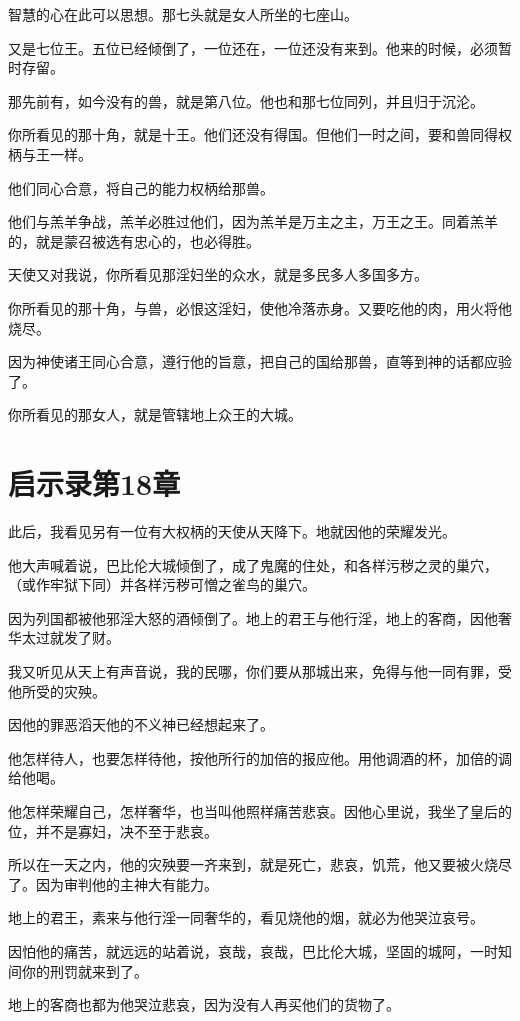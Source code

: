 \documentclass[12pt,oneside]{book}
\begin{document}
智慧的心在此可以思想。那七头就是女人所坐的七座山。

又是七位王。五位已经倾倒了，一位还在，一位还没有来到。他来的时候，必须暂时存留。

那先前有，如今没有的兽，就是第八位。他也和那七位同列，并且归于沉沦。

你所看见的那十角，就是十王。他们还没有得国。但他们一时之间，要和兽同得权柄与王一样。

他们同心合意，将自己的能力权柄给那兽。

他们与羔羊争战，羔羊必胜过他们，因为羔羊是万主之主，万王之王。同着羔羊的，就是蒙召被选有忠心的，也必得胜。

天使又对我说，你所看见那淫妇坐的众水，就是多民多人多国多方。

你所看见的那十角，与兽，必恨这淫妇，使他冷落赤身。又要吃他的肉，用火将他烧尽。

因为神使诸王同心合意，遵行他的旨意，把自己的国给那兽，直等到神的话都应验了。

你所看见的那女人，就是管辖地上众王的大城。

\chapter{启示录第18章}
此后，我看见另有一位有大权柄的天使从天降下。地就因他的荣耀发光。

他大声喊着说，巴比伦大城倾倒了，成了鬼魔的住处，和各样污秽之灵的巢穴，（或作牢狱下同）并各样污秽可憎之雀鸟的巢穴。

因为列国都被他邪淫大怒的酒倾倒了。地上的君王与他行淫，地上的客商，因他奢华太过就发了财。

我又听见从天上有声音说，我的民哪，你们要从那城出来，免得与他一同有罪，受他所受的灾殃。

因他的罪恶滔天他的不义神已经想起来了。

他怎样待人，也要怎样待他，按他所行的加倍的报应他。用他调酒的杯，加倍的调给他喝。

他怎样荣耀自己，怎样奢华，也当叫他照样痛苦悲哀。因他心里说，我坐了皇后的位，并不是寡妇，决不至于悲哀。

所以在一天之内，他的灾殃要一齐来到，就是死亡，悲哀，饥荒，他又要被火烧尽了。因为审判他的主神大有能力。

地上的君王，素来与他行淫一同奢华的，看见烧他的烟，就必为他哭泣哀号。

因怕他的痛苦，就远远的站着说，哀哉，哀哉，巴比伦大城，坚固的城阿，一时知间你的刑罚就来到了。

地上的客商也都为他哭泣悲哀，因为没有人再买他们的货物了。
\end{document}

